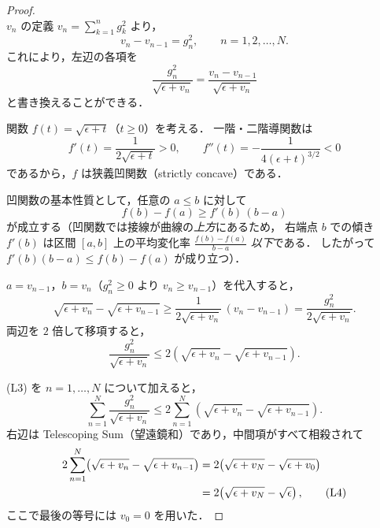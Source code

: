 \documentclass[dvipdfmx,a4paper,11pt]{jsarticle}
\begin{document}
\begin{proof}\ \\
\noindent
$v_n$ の定義 $v_n = \sum_{k=1}^n g_k^2$ より，
\[
    v_n - v_{n-1} = g_n^2, \qquad n = 1, 2, \ldots, N.
    \tag{L1}
\]
これにより，左辺の各項を
\[
    \frac{g_n^2}{\sqrt{\epsilon + v_n}}
    = \frac{v_n - v_{n-1}}{\sqrt{\epsilon + v_n}}
\]
と書き換えることができる．

\medskip
\noindent
関数 $f(t) = \sqrt{\epsilon + t}$（$t \geq 0$）を考える．
一階・二階導関数は
\[
    f'(t) = \frac{1}{2\sqrt{\epsilon + t}} > 0, \qquad
    f''(t) = -\frac{1}{4(\epsilon + t)^{3/2}} < 0
\]
であるから，$f$ は狭義凹関数（strictly concave）である．

凹関数の基本性質として，任意の $a \leq b$ に対して
\[
    f(b) - f(a) \geq f'(b)\,(b - a)
    \tag{L2}
\]
が成立する（凹関数では接線が曲線の\emph{上方}にあるため，
右端点 $b$ での傾き $f'(b)$ は区間 $[a,b]$ 上の平均変化率
$\frac{f(b)-f(a)}{b-a}$ \emph{以下}である．
したがって $f'(b)(b-a) \leq f(b)-f(a)$ が成り立つ）．

\medskip
\noindent
$a = v_{n-1}$，$b = v_n$（$g_n^2 \geq 0$ より $v_n \geq v_{n-1}$）を代入すると，
\[
    \sqrt{\epsilon + v_n} - \sqrt{\epsilon + v_{n-1}}
    \geq \frac{1}{2\sqrt{\epsilon + v_n}}\,(v_n - v_{n-1})
    = \frac{g_n^2}{2\sqrt{\epsilon + v_n}}.
\]
両辺を $2$ 倍して移項すると，
\[
    \frac{g_n^2}{\sqrt{\epsilon + v_n}}
    \leq 2\!\left(\sqrt{\epsilon + v_n} - \sqrt{\epsilon + v_{n-1}}\right).
    \tag{L3}
\]

\medskip
\noindent
(L3) を $n = 1, \ldots, N$ について加えると，
\[
    \sum_{n=1}^N \frac{g_n^2}{\sqrt{\epsilon + v_n}}
    \leq 2\sum_{n=1}^N
      \!\left(\sqrt{\epsilon + v_n} - \sqrt{\epsilon + v_{n-1}}\right).
\]
右辺は Telescoping Sum（望遠鏡和）であり，中間項がすべて相殺されて
\begin{align}
    2\sum_{n=1}^N \!\left(\sqrt{\epsilon + v_n} - \sqrt{\epsilon + v_{n-1}}\right)
    &= 2\!\left(\sqrt{\epsilon + v_N} - \sqrt{\epsilon + v_0}\right) \notag\\
    &= 2\!\left(\sqrt{\epsilon + v_N} - \sqrt{\epsilon}\right),
    \tag{L4}
\end{align}
ここで最後の等号には $v_0 = 0$ を用いた．


\end{proof}
\end{document}
